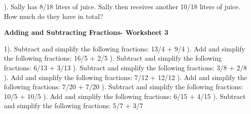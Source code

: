 \documentclass{article}%
\begin{document}
\newline%
\newline%
). Sally has 8/18 liters of juice. Sally then receives another 10/18 liters of juice. How much do they have in total?%
\newline%
\newline%
\newline%
\pagebreak%
\large%
\begin{center}%
\textbf{Adding and Subtracting Fractions- Worksheet 3}%
\newline%
\newline%
\newline%
\end{center} \normalsize%
1). Subtract and simplify the following fractions: 13/4 + 9/4%
\newline%
\newline%
). Add and simplify the following fractions: 16/5 + 2/5%
\newline%
\newline%
). Subtract and simplify the following fractions: 6/13 + 3/13%
\newline%
\newline%
). Subtract and simplify the following fractions: 3/8 + 2/8%
\newline%
\newline%
). Add and simplify the following fractions: 7/12 + 12/12%
\newline%
\newline%
). Add and simplify the following fractions: 7/20 + 7/20%
\newline%
\newline%
). Subtract and simplify the following fractions: 10/5 + 10/5%
\newline%
\newline%
). Add and simplify the following fractions: 6/15 + 4/15%
\newline%
\newline%
). Subtract and simplify the following fractions: 5/7 + 3/7%
\newline%
\newline%
\end{document}
